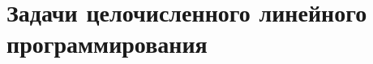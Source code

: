 \documentclass[../main.tex]{subfiles}
\begin{document}
 \chapter{Задачи целочисленного линейного программирования}
 
\end{document}
